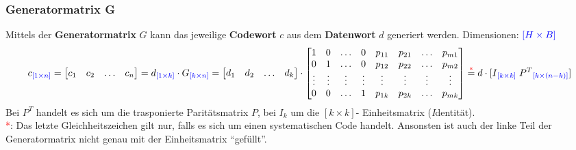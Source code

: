 \subsubsection{Generatormatrix G }
Mittels der \textbf{Generatormatrix} $G$ kann das jeweilige \textbf{Codewort} $c$ aus dem \textbf{Datenwort} $d$
generiert werden. Dimensionen: $\textcolor{blue}{[H\times B]}$
$$ c\textcolor{blue}{_{[1 \times n]}} = \begin{bmatrix} c_1 & c_2 & \ldots & c_n \end{bmatrix} =
d\textcolor{blue}{_{[1 \times k]}} \cdot G\textcolor{blue}{_{[k \times n]}} =
                \begin{bmatrix} d_1 & d_2 & \ldots & d_k \end{bmatrix} 
				\cdot \begin{bmatrix} 
					1 & 0 & \ldots & 0 & p_{11} & p_{21} & \ldots & p_{m1} \\              
					0 & 1 & \ldots & 0 & p_{12} & p_{22} & \ldots & p_{m2} \\
					\vdots & \vdots & \vdots & \vdots & \vdots & \vdots & \vdots & \vdots \\
					0 & 0 & \ldots & 1 & p_{1k} & p_{2k} & \ldots & p_{mk} \\
				\end{bmatrix} \overset{\textcolor{red}{*}}{=} d \cdot [I\textcolor{blue}{_{[k \times k]}} \;
				P^T\textcolor{blue}{_{[k \times (n-k)]}}] $$ Bei $P^T$ handelt es sich um die trasponierte
				Paritätsmatrix $P$, bei $I_k$ um die $[k \times k]$- Einheitsmatrix (\emph{I}dentität). \\
\textcolor{red}{*}: Das letzte Gleichheitszeichen gilt nur, falls
es sich um einen systematischen Code handelt. Ansonsten ist auch der linke Teil der Generatormatrix
nicht genau mit der Einheitsmatrix ``gefüllt''.

